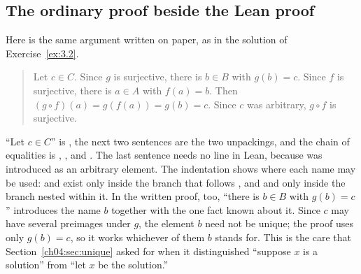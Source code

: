 \subsection*{The ordinary proof beside the Lean proof}
Here is the same argument written on paper, as in the solution of Exercise~\ref{ex:3.2}.
\begin{quote}
Let $c\in C$. Since $g$ is surjective, there is $b\in B$ with $g(b)=c$. Since $f$ is surjective, there is $a\in A$ with $f(a)=b$. Then $(g\circ f)(a)=g(f(a))=g(b)=c$. Since $c$ was arbitrary, $g\circ f$ is surjective.
\end{quote}
``Let $c\in C$'' is , the next two sentences are the two unpackings, and the chain of equalities is , , and . The last sentence needs no line in Lean, because  was introduced as an arbitrary element. The indentation shows where each name may be used:  and  exist only inside the branch that follows , and  and  only inside the branch nested within it. In the written proof, too, ``there is $b\in B$ with $g(b)=c$'' introduces the name $b$ together with the one fact known about it. Since $c$ may have several preimages under $g$, the element $b$ need not be unique; the proof uses only $g(b)=c$, so it works whichever of them $b$ stands for. This is the care that Section~\ref{ch04:sec:unique} asked for when it distinguished ``suppose $x$ is a solution'' from ``let $x$ be the solution.''

